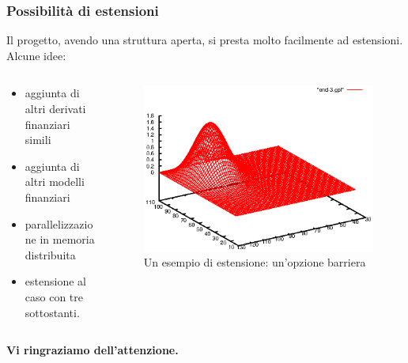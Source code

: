 \documentclass{beamer}
\begin{document}
\begin{frame}
 \frametitle{Possibilità di estensioni}
 
 Il progetto, avendo una struttura aperta, si presta molto facilmente ad estensioni. Alcune idee:
 \begin{columns}[c]
\begin{column}[t]{.5\linewidth}

 \begin{itemize}[<+->]
  \item aggiunta di altri derivati finanziari simili
  \item aggiunta di altri modelli finanziari
  \item parallelizzazione in memoria distribuita
  \item estensione al caso con tre sottostanti.
 \end{itemize}

\end{column}

\begin{column}[t]{.5\linewidth}

\begin{figure}
\centering
\includegraphics[width=\linewidth]{extension-barrier}
\caption{Un esempio di estensione: un'opzione barriera}
\end{figure}

\end{column}

\end{columns}
 
\end{frame}



\begin{frame}[plain]
\centering
 \bf{\LARGE Vi ringraziamo dell'attenzione.}\\
\end{frame}
\end{document}
